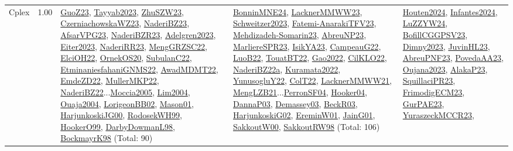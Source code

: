 {\begin{longtable}{p{3cm}r>{\raggedright\arraybackslash}p{6cm}>{\raggedright\arraybackslash}p{6cm}>{\raggedright\arraybackslash}p{8cm}}
\index{Cplex}\index{CPSystems!Cplex}Cplex &  1.00 & \hyperref[detail:GuoZ23]{GuoZ23}, \hyperref[detail:Tayyab2023]{Tayyab2023}, \hyperref[detail:ZhuSZW23]{ZhuSZW23}, \hyperref[detail:CzerniachowskaWZ23]{CzerniachowskaWZ23}, \hyperref[detail:NaderiBZ23]{NaderiBZ23}, \hyperref[detail:AfsarVPG23]{AfsarVPG23}, \hyperref[detail:NaderiBZR23]{NaderiBZR23}, \hyperref[detail:Adelgren2023]{Adelgren2023}, \hyperref[detail:Eiter2023]{Eiter2023}, \hyperref[detail:NaderiRR23]{NaderiRR23}, \hyperref[detail:MengGRZSC22]{MengGRZSC22}, \hyperref[detail:ElciOH22]{ElciOH22}, \hyperref[detail:OrnekOS20]{OrnekOS20}, \hyperref[detail:SubulanC22]{SubulanC22}, \hyperref[detail:EtminaniesfahaniGNMS22]{EtminaniesfahaniGNMS22}, \hyperref[detail:AwadMDMT22]{AwadMDMT22}, \hyperref[detail:EmdeZD22]{EmdeZD22}, \hyperref[detail:MullerMKP22]{MullerMKP22}, \hyperref[detail:NaderiBZ22]{NaderiBZ22}...\hyperref[detail:Moccia2005]{Moccia2005}, \hyperref[detail:Lim2004]{Lim2004}, \hyperref[detail:Ouaja2004]{Ouaja2004}, \hyperref[detail:LorigeonBB02]{LorigeonBB02}, \hyperref[detail:Mason01]{Mason01}, \hyperref[detail:HarjunkoskiJG00]{HarjunkoskiJG00}, \hyperref[detail:RodosekWH99]{RodosekWH99}, \hyperref[detail:HookerO99]{HookerO99}, \hyperref[detail:DarbyDowmanL98]{DarbyDowmanL98}, \hyperref[detail:BockmayrK98]{BockmayrK98} (Total: 90) & \hyperref[detail:BonninMNE24]{BonninMNE24}, \hyperref[detail:LacknerMMWW23]{LacknerMMWW23}, \hyperref[detail:Schweitzer2023]{Schweitzer2023}, \hyperref[detail:Fatemi-AnarakiTFV23]{Fatemi-AnarakiTFV23}, \hyperref[detail:Mehdizadeh-Somarin23]{Mehdizadeh-Somarin23}, \hyperref[detail:AbreuNP23]{AbreuNP23}, \hyperref[detail:MarliereSPR23]{MarliereSPR23}, \hyperref[detail:IsikYA23]{IsikYA23}, \hyperref[detail:CampeauG22]{CampeauG22}, \hyperref[detail:LuoB22]{LuoB22}, \hyperref[detail:TouatBT22]{TouatBT22}, \hyperref[detail:Gao2022]{Gao2022}, \hyperref[detail:CilKLO22]{CilKLO22}, \hyperref[detail:NaderiBZ22a]{NaderiBZ22a}, \hyperref[detail:Kuramata2022]{Kuramata2022}, \hyperref[detail:YunusogluY22]{YunusogluY22}, \hyperref[detail:ColT22]{ColT22}, \hyperref[detail:LacknerMMWW21]{LacknerMMWW21}, \hyperref[detail:MengLZB21]{MengLZB21}...\hyperref[detail:PerronSF04]{PerronSF04}, \hyperref[detail:Hooker04]{Hooker04}, \hyperref[detail:DannaP03]{DannaP03}, \hyperref[detail:Demassey03]{Demassey03}, \hyperref[detail:BeckR03]{BeckR03}, \hyperref[detail:HarjunkoskiG02]{HarjunkoskiG02}, \hyperref[detail:EreminW01]{EreminW01}, \hyperref[detail:JainG01]{JainG01}, \hyperref[detail:SakkoutW00]{SakkoutW00}, \hyperref[detail:SakkoutRW98]{SakkoutRW98} (Total: 106) & \hyperref[detail:Houten2024]{Houten2024}, \hyperref[detail:Infantes2024]{Infantes2024}, \hyperref[detail:LuZZYW24]{LuZZYW24}, \hyperref[detail:BofillCGGPSV23]{BofillCGGPSV23}, \hyperref[detail:Dimny2023]{Dimny2023}, \hyperref[detail:JuvinHL23]{JuvinHL23}, \hyperref[detail:AbreuPNF23]{AbreuPNF23}, \hyperref[detail:PovedaAA23]{PovedaAA23}, \hyperref[detail:Oujana2023]{Oujana2023}, \hyperref[detail:AlakaP23]{AlakaP23}, \hyperref[detail:SquillaciPR23]{SquillaciPR23}, \hyperref[detail:FrimodigECM23]{FrimodigECM23}, \hyperref[detail:GurPAE23]{GurPAE23}, \hyperref[detail:YuraszeckMCCR23]{YuraszeckMCCR23}, 
\end{longtable}}
